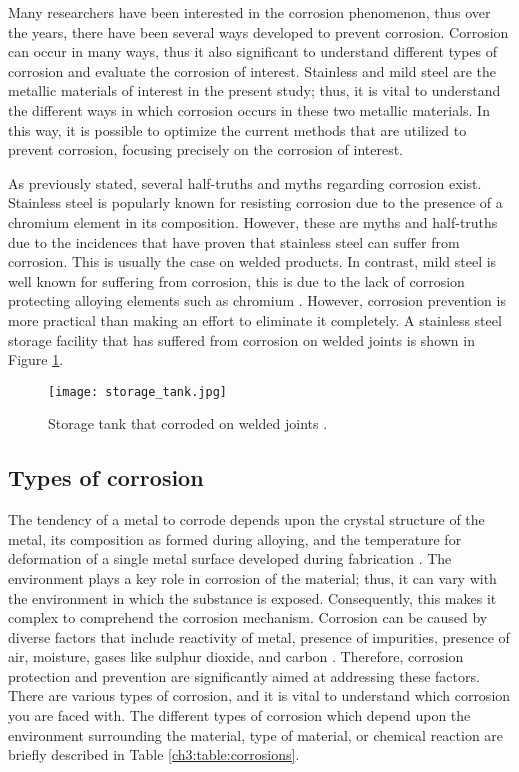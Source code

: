 Many researchers have been interested in the corrosion phenomenon, thus over the years, there have been several ways developed to prevent corrosion. Corrosion can occur in many ways, thus it also significant to understand different types of corrosion and evaluate the corrosion of interest. Stainless and mild steel are the metallic materials of interest in the present study; thus, it is vital to understand the different ways in which corrosion occurs in these two metallic materials. In this way, it is possible to optimize the current methods that are utilized to prevent corrosion, focusing precisely on the corrosion of interest.

As previously stated, several half-truths and myths regarding corrosion exist. Stainless steel is popularly known for resisting corrosion due to the presence of a chromium element in its composition. However, these are myths and half-truths due to the incidences that have proven that stainless steel can suffer from corrosion. This is usually the case on welded products. In contrast, mild steel is well known for suffering from corrosion, this is due to the lack of corrosion protecting alloying elements such as chromium \cite{hackerman1987theory}. However, corrosion prevention is more practical than making an effort to eliminate it completely. A stainless steel storage facility that has suffered from corrosion on welded joints is shown in Figure \ref{ch3:figure:tank}.
 
\begin{figure}[H]
    \centering
    \texttt{[image: storage\_tank.jpg]}
    \caption{Storage tank that corroded on welded joints \cite{karayan2014weld}.}
    \label{ch3:figure:tank}
\end{figure}

\subsection{Types of corrosion} 
The tendency of a metal to corrode depends upon the crystal structure of the metal, its composition as formed during alloying, and the temperature for deformation of a single metal surface developed during fabrication \cite{sourmail2005stainless}. The environment plays a key role in corrosion of the material; thus, it can vary with the environment in which the substance is exposed. Consequently, this makes it complex to comprehend the corrosion mechanism. Corrosion can be caused by diverse factors that include reactivity of metal, presence of impurities, presence of air, moisture, gases like sulphur dioxide, and carbon \cite{sourmail2005stainless}. Therefore, corrosion protection and prevention are significantly aimed at addressing these factors. There are various types of corrosion, and it is vital to understand which corrosion you are faced with. The different types of corrosion which depend upon the environment surrounding the material, type of material, or chemical reaction are briefly described in Table \ref{ch3:table:corrosions}.

